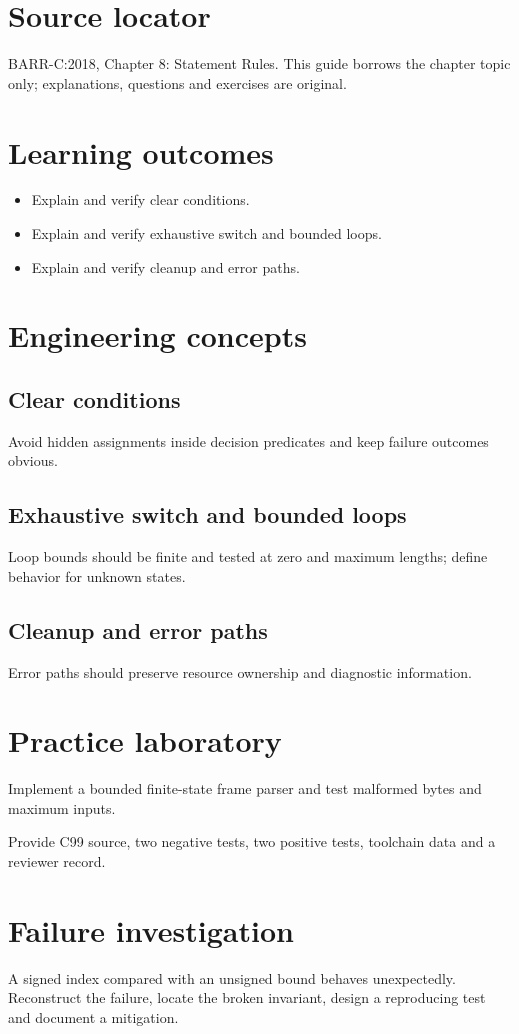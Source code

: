 \documentclass[10pt,letterpaper]{article}
\begin{document}
\makedoctitle
\makedocsummary
\section{Source locator}
BARR-C:2018, Chapter 8: Statement Rules. This guide borrows the chapter topic only; explanations, questions and exercises are original.
\section{Learning outcomes}
\begin{itemize}
\item Explain and verify clear conditions.
\item Explain and verify exhaustive switch and bounded loops.
\item Explain and verify cleanup and error paths.
\end{itemize}

\section{Engineering concepts}
\subsection{Clear conditions}
Avoid hidden assignments inside decision predicates and keep failure outcomes obvious.

\subsection{Exhaustive switch and bounded loops}
Loop bounds should be finite and tested at zero and maximum lengths; define behavior for unknown states.

\subsection{Cleanup and error paths}
Error paths should preserve resource ownership and diagnostic information.

\section{Practice laboratory}
Implement a bounded finite-state frame parser and test malformed bytes and maximum inputs.

Provide C99 source, two negative tests, two positive tests, toolchain data and a reviewer record.
\section{Failure investigation}
A signed index compared with an unsigned bound behaves unexpectedly. Reconstruct the failure, locate the broken invariant, design a reproducing test and document a mitigation.
\end{document}
